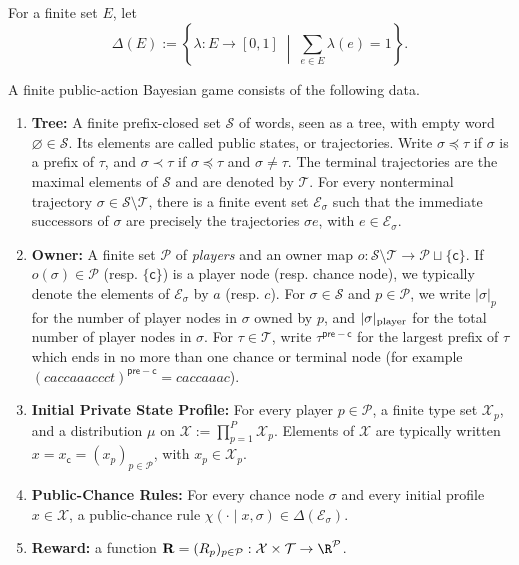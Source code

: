 \documentclass[12pt, a4paper]{article}
\begin{document}
\begin{definition}\label{def:finite-pbg}
For a finite set $E$, let
\begin{equation}\label{eq:probability-simplex}
\Delta(E):=\left\{\lambda:E\to[0,1]\;\middle|\;\sum_{e\in E}\lambda(e)=1\right\}.
\end{equation}

A finite public-action Bayesian game consists of the following data.
\begin{enumerate}[label =(\roman*)]
    \item \textbf{Tree:} A finite prefix-closed set $\mathcal S$ of words, seen as a tree, with empty word $\varnothing\in\mathcal S$.
    Its elements are called public states, or trajectories.
    Write $\sigma\preccurlyeq\tau$ if $\sigma$ is a prefix of $\tau$, and $\sigma\prec\tau$ if $\sigma\preccurlyeq\tau$ and $\sigma\neq\tau$.
    The terminal trajectories are the maximal elements of $\mathcal S$ and are denoted by $\mathcal T$.
    For every nonterminal trajectory $\sigma\in\mathcal S\setminus\mathcal T$, there is a finite event set $\mathcal E_\sigma$ such that the immediate successors of $\sigma$ are precisely the trajectories $\sigma e$, with $e\in\mathcal E_\sigma$.

    \item \textbf{Owner:} A finite set $\mathcal{P}$ of \textit{players} and an owner map $o:\mathcal S\setminus\mathcal T \to \mathcal{P}\sqcup\{\mathsf c\}$.
    If $o(\sigma)\in\mathcal P$ (resp. $\{\mathsf c\}$) is a player node (resp. chance node), we typically denote the elements of $\mathcal{E}_\sigma$ by $a$ (resp. $c$).
    For $\sigma \in \mathcal S$ and $p \in \mathcal P$, we write $|\sigma|_p$ for the number of player nodes in $\sigma$ owned by $p$, and $|\sigma|_{\textnormal{player}}$ for the total number of player nodes in $\sigma$.
    For $\tau \in \mathcal{T}$, write $\tau^{\mathsf{pre-c}}$ for the largest prefix of $\tau$ which ends in no more than one chance or terminal node (for example $(caccaaaccct)^{\mathsf{pre-c}} = caccaaac$).

    \item \textbf{Initial Private State Profile:} For every player $p\in \mathcal P$, a finite type set $\mathcal X_p$, and a distribution $\mu$ on $\mathcal X:=\prod_{p=1}^P\mathcal X_p$.
    Elements of $\mathcal X$ are typically written $x= x_{\mathsf c} = (x_p)_{p \in \mathcal P}$, with $x_p\in\mathcal X_p$.

    \item \textbf{Public-Chance Rules:} For every chance node $\sigma$ and every initial profile $x \in \mathcal{X}$, a public-chance rule $\chi(\cdot \mid x, \sigma)\in \Delta(\mathcal E_\sigma)$.

    \item \textbf{Reward:} a function $\mathbf{R} = (R_p)_{p \in \mathcal{P}}: \mathcal{X} \times \mathcal{T}\to\R^{\mathcal{P}}$.
\end{enumerate}
\end{definition}
\end{document}
